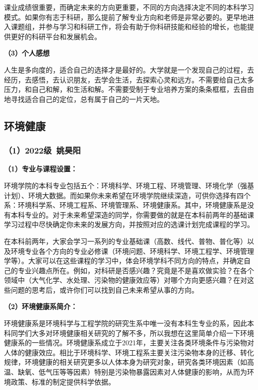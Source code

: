 \documentclass[11pt,oneside]{book}
\begin{document}
\vspace{10pt}

课业成绩很重要，而确定未来的方向更重要，不同的方向选择决定不同的本科学习模式。如果你有志于科研，那么提前了解专业方向和老师是非常必要的。更早地进入课题组，并参与学习和科研工作，将会有助于你科研技能和经验的增长，也能提供更好的科研平台和发展机会。

\vspace{10pt}

\textbf{（3）个人感想}

人生是多向度的，适合自己的选择才是最好的。大学就是一个发现自己的过程，去经历，去感悟，去认识朋友，去学会生活，去探索心灵和远方。不需要给自己太多压力，和自己和解，和生活和解。不需要受制于专业培养方案的条条框框，去自由地寻找适合自己的定位，总有属于自己的一片天地。

\subsection{环境健康}

\subsubsection{（1）2022级\ 姚昊阳}

\textbf{（1）专业与课程设置：}

环境学院的本科专业包括五个：环境科学、环境工程、环境管理、环境化学（强基计划）、环境大数据。而如果你未来希望在环境学院继续深造，可供你选择有四个系：环境科学系、环境工程系、环境管理系、环境健康系。其中，环境健康系是没有本科专业的。对于未来希望深造的同学，你需要做的就是在本科前两年的基础课学习过程中尽快确定你未来的发展方向，并按照对应的选课计划完成课程的学习。

\vspace{10pt}

在本科前两年，大家会学习一系列的专业基础课（高数、线代、普物、普化等）以及环境专业各个方向的专业必修课（环境问题、环境科学、环境工程学、环境管理学等）。大家可以在这些课程的学习中，体会环境学科不同方向的特点，并确定自己的专业兴趣点所在。例如，对科研是否感兴趣？究竟是不是喜欢做实验？在各个领域中（大气化学、水处理、污染物的健康效应等）对哪个方向更感兴趣？在对这些问题的思考后，或许你们可以找到自己未来希望从事的方向。

\vspace{10pt}

\textbf{（2）环境健康系简介：}

环境健康系是环境科学与工程学院的研究生系中唯一没有本科生专业的系，因此本科同学们大多对环境健康相关研究的了解不多，所以我想在这里简单介绍一下环境健康系的一些情况。环境健康系成立于2021年，主要关注各类环境条件与污染物对人体的健康效应。相比于环境科学、环境工程系主要关注污染物本身的迁移、转化规律，环境健康的相关研究更多以人体本身为研究对象，研究各类环境因素（如高温、缺氧、低气压等等因素）特别是污染物暴露因素对人体健康的影响，从而为环境政策、标准的制定提供科学依据。
\end{document}
